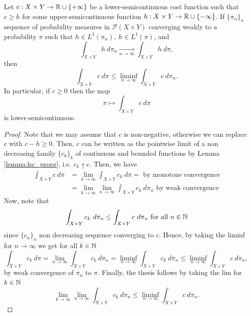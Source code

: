 \documentclass[../main.tex]{subfiles}
\begin{document}
\begin{lemma}
\label{lemma:integral_cost_lsc}
    Let $c: X\times Y\to \mathbb{R}\cup\{+\infty\}$ be a lower-semicontinuous cost function such that $c\geq h$ for some upper-semicontinuous function $h:X\times Y\to \mathbb{R}\cup\{-\infty\}$. If $\{\pi_n\}_n$ sequence of probability measures in $\mathcal{P}(X\times Y)$ converging weakly to a probability $\pi$ such that $h\in L^1(\pi_n), \ h\in L^1(\pi)$, and $$\int_{X\times Y} h \ d\pi_n\underset{n\to\infty}{\longrightarrow} \int_{X\times Y} h \ d\pi,$$ then $$\int_{X\times Y} c \ d\pi \leq \liminf_{n\to\infty} \int_{X\times Y} c \ d\pi_n.$$ 
    In particular, if $c\geq 0$ then the map $$\pi\mapsto\int_{X \times Y} c \ d\pi$$ is lower-semicontinuous.
\end{lemma}
\begin{proof}
Note that we may assume that $c$ is non-negative, otherwise we can replace $c$ with $c - h\geq 0$. Then, $c$ can be written
as the pointwise limit of a non decreasing family $\{c_k\}_k$ of continuous and bounded functions by Lemma \ref{lemma:lsc_propr}, i.e. $c_k \uparrow c$. Then, we have
\begin{align*}
    \int_{X\times Y} c \ d\pi 
    &= \lim_{k\to\infty} \int_{X\times Y} c_k \ d\pi = \text{ by monotone convergence} \\
    &= \lim_{k\to\infty} \lim_{n\to\infty}\int_{X\times Y} c_k \ d\pi_n \text{ by weak convergence}
\end{align*}
Now, note that 
$$
\int_{X\times Y} c_k \ d\pi_n \leq \int_{X\times Y} c \ d\pi_n \text{ for all } n\in\mathbb{N}
$$
since $\{c_n\}_n$ non decreasing sequence converging to $c$. Hence, by taking the liminf for $n\to \infty$ we get for all $k\in\mathbb{N}$
$$
\int_{X\times Y} c_k \ d\pi 
= \lim_{n\to\infty} \int_{X\times Y} c_k \ d\pi_n
= \liminf_{n\to\infty} \int_{X\times Y} c_k \ d\pi_n 
\leq \liminf_{n\to\infty} \int_{X\times Y} c \ d\pi_n,
$$
by weak convergence of $\pi_n$ to $\pi$. Finally, the thesis follows by taking the lim for $k\in\mathbb{N}$
$$
\lim_{k\to\infty}\lim_{n\to\infty} \int_{X\times Y} c_k \ d\pi_n 
\leq \liminf_{n\to\infty} \int_{X\times Y} c \ d\pi_n.
$$
\end{proof}
\end{document}
